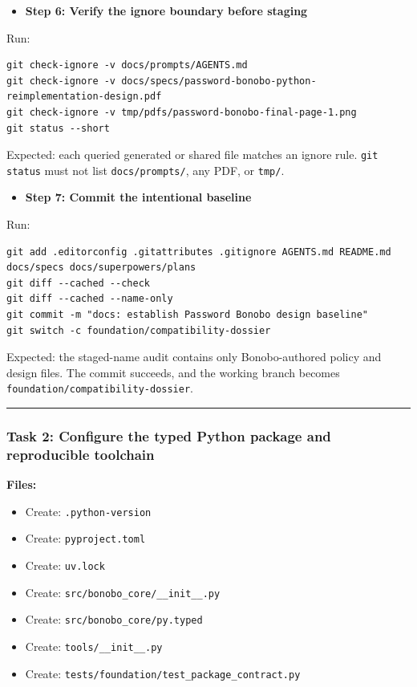 \documentclass[
  letterpaper,
]{article}
\newcommand{\passthrough}[1]{#1}
\providecommand{\tightlist}{%
  \setlength{\itemsep}{0pt}\setlength{\parskip}{0pt}}
\begin{document}
\begin{itemize}
\tightlist
\item[$\boxtimes$]
  \textbf{Step 6: Verify the ignore boundary before staging}
\end{itemize}

Run:

\begin{lstlisting}
git check-ignore -v docs/prompts/AGENTS.md
git check-ignore -v docs/specs/password-bonobo-python-reimplementation-design.pdf
git check-ignore -v tmp/pdfs/password-bonobo-final-page-1.png
git status --short
\end{lstlisting}

Expected: each queried generated or shared file matches an ignore rule. \passthrough{\lstinline!git status!} must not
list \nolinkurl{docs/prompts/}, any PDF, or \passthrough{\lstinline!tmp/!}.

\begin{itemize}
\tightlist
\item[$\boxtimes$]
  \textbf{Step 7: Commit the intentional baseline}
\end{itemize}

Run:

\begin{lstlisting}
git add .editorconfig .gitattributes .gitignore AGENTS.md README.md docs/specs docs/superpowers/plans
git diff --cached --check
git diff --cached --name-only
git commit -m "docs: establish Password Bonobo design baseline"
git switch -c foundation/compatibility-dossier
\end{lstlisting}

Expected: the staged-name audit contains only Bonobo-authored policy and design files. The commit succeeds, and the
working branch becomes \nolinkurl{foundation/compatibility-dossier}.

\begin{center}\rule{0.5\linewidth}{0.5pt}\end{center}

\subsubsection{Task 2: Configure the typed Python package and reproducible
toolchain}\label{task-2-configure-the-typed-python-package-and-reproducible-toolchain}

\textbf{Files:}

\begin{itemize}
\tightlist
\item
  Create: \nolinkurl{.python-version}
\item
  Create: \nolinkurl{pyproject.toml}
\item
  Create: \passthrough{\lstinline!uv.lock!}
\item
  Create: \nolinkurl{src/bonobo_core/__init__.py}
\item
  Create: \nolinkurl{src/bonobo_core/py.typed}
\item
  Create: \nolinkurl{tools/__init__.py}
\item
  Create: \nolinkurl{tests/foundation/test_package_contract.py}
\end{itemize}
\end{document}
